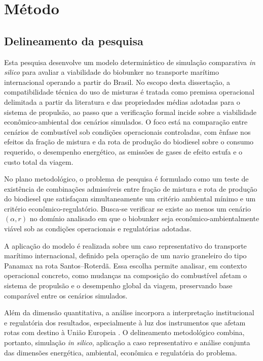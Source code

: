 \chapter{Método}
\label{chap_metodo}

\section{Delineamento da pesquisa}

Esta pesquisa desenvolve um modelo determinístico de simulação comparativa \emph{in silico} para avaliar a viabilidade do biobunker no transporte marítimo internacional operando a partir do Brasil. No escopo desta dissertação, a compatibilidade técnica do uso de misturas é tratada como premissa operacional delimitada a partir da literatura e das propriedades médias adotadas para o sistema de propulsão, ao passo que a verificação formal incide sobre a viabilidade econômico-ambiental dos cenários simulados. O foco está na comparação entre cenários de combustível sob condições operacionais controladas, com ênfase nos efeitos da fração de mistura e da rota de produção do biodiesel sobre o consumo requerido, o desempenho energético, as emissões de gases de efeito estufa e o custo total da viagem.

No plano metodológico, o problema de pesquisa é formulado como um teste de existência de combinações admissíveis entre fração de mistura e rota de produção do biodiesel que satisfaçam simultaneamente um critério ambiental mínimo e um critério econômico-regulatório. Busca-se verificar se existe ao menos um cenário $(\alpha,r)$ no domínio analisado em que o biobunker seja econômico-ambientalmente viável sob as condições operacionais e regulatórias adotadas.

A aplicação do modelo é realizada sobre um caso representativo do transporte marítimo internacional, definido pela operação de um navio graneleiro do tipo Panamax na rota Santos--Roterdã. Essa escolha permite analisar, em contexto operacional concreto, como mudanças na composição do combustível afetam o sistema de propulsão e o desempenho global da viagem, preservando base comparável entre os cenários simulados.

Além da dimensão quantitativa, a análise incorpora a interpretação institucional e regulatória dos resultados, especialmente à luz dos instrumentos que afetam rotas com destino à União Europeia \citep{international_maritime_organization_fourth_2020}. O delineamento metodológico combina, portanto, simulação \emph{in silico}, aplicação a caso representativo e análise conjunta das dimensões energética, ambiental, econômica e regulatória do problema.

